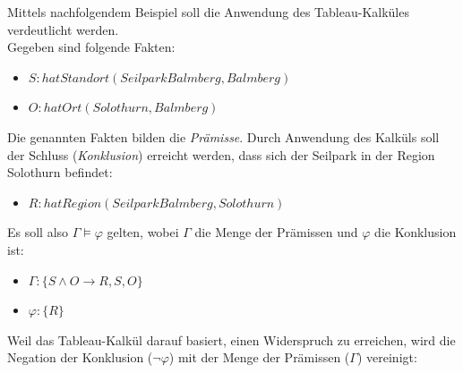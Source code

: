 \begin{table}[H]
\centering
{} \hfill
{}
\end{table}

Mittels nachfolgendem Beispiel soll die Anwendung des Tableau-Kalküles verdeutlicht werden.\\
Gegeben sind folgende Fakten:
\begin{itemize}
    \item $S: hatStandort(SeilparkBalmberg, Balmberg)$
    \item $O: hatOrt(Solothurn, Balmberg)$
\end{itemize}
Die genannten Fakten bilden die \textit{Prämisse}. Durch Anwendung des Kalküls soll der Schluss (\textit{Konklusion}) erreicht werden, dass sich der Seilpark in der Region Solothurn befindet:
\begin{itemize}
    \item $R: hatRegion(SeilparkBalmberg, Solothurn)$
\end{itemize}

Es soll also $\Gamma \models \varphi$ gelten, wobei $\Gamma$ die Menge der Prämissen und $\varphi$ die Konklusion ist:
\begin{itemize}
    \item $\Gamma: \{S \wedge O \rightarrow R, S, O\}$
    \item $\varphi: \{R\}$
\end{itemize}

Weil das Tableau-Kalkül darauf basiert, einen Widerspruch zu erreichen, wird die Negation der Konklusion ($\neg \varphi$) mit der Menge der Prämissen ($\Gamma$) vereinigt:

